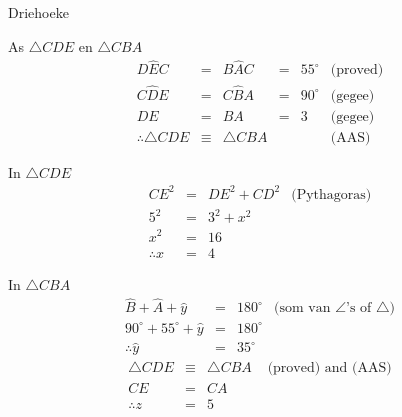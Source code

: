 \begin{wex}{Driehoeke}
{As $\triangle CDE$ en $\triangle CBA$
\begin{equation*}
 \begin{array}{rcclll}
D\hat{E}C &=& B\hat{A}C &=& 55^{\circ}  & \mbox{(proved)} \\
C\hat{D}E &=& C\hat{B}A &=& 90^{\circ}  & \mbox{(gegee)} \\
DE &=& BA &=& 3  & \mbox{(gegee)} \\
\therefore \triangle{CDE} &\equiv& \triangle {CBA} &&& \mbox{(AAS)} 
 \end{array}
\end{equation*}

In $\triangle CDE$
\begin{equation*}
 \begin{array}{rcll}

CE^{2} &=& DE^{2} + CD^{2} & \mbox{(Pythagoras)} \\
5^{2} &=& 3^{2} + x^{2} &  \\
x^{2} &=& 16 & \\
\therefore x &=& 4 & 
 \end{array}
\end{equation*}

In $\triangle CBA$
\begin{equation*}
 \begin{array}{rcll}
\hat{B} + \hat{A} + \hat{y} &=& 180^{\circ}  & \mbox{(som van $\angle$'s of $\triangle$)} \\
90^{\circ} + 55^{\circ} + \hat{y} &=& 180^{\circ}  & \\
\therefore \hat{y} &=& 35^{\circ} & 
 \end{array}
\end{equation*}
\begin{equation*}
 \begin{array}{rcll}
\triangle CDE &\equiv& \triangle CBA &\mbox{ (proved) and (AAS)} \\
 CE &=& CA  & \\
 \therefore z &=& 5 & 
 \end{array}
\end{equation*}

}
\end{wex}
% 
% 
%    

